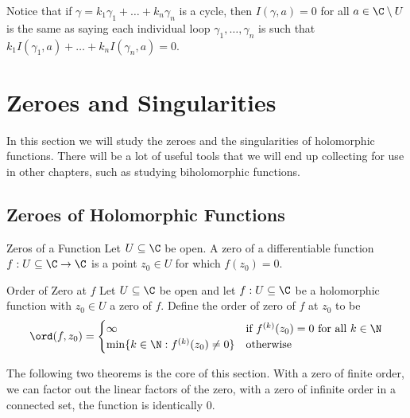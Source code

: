 \documentclass[a4paper]{article}
\begin{document}
Notice that if $\gamma=k_1\gamma_1+\dots+k_n\gamma_n$ is a cycle, then $I(\gamma,a)=0$ for all $a\in\C\setminus U$ is the same as saying each individual loop $\gamma_1,\dots,\gamma_n$ is such that $k_1I(\gamma_1,a)+\dots+k_nI(\gamma_n,a)=0$. 

\pagebreak
\section{Zeroes and Singularities}
In this section we will study the zeroes and the singularities of holomorphic functions. There will be a lot of useful tools that we will end up collecting for use in other chapters, such as studying biholomorphic functions. 

\subsection{Zeroes of Holomorphic Functions}
\begin{defn}{Zeros of a Function}{} Let $U\subseteq\C$ be open. A zero of a differentiable function $f:U\subseteq\C\to\C$ is a point $z_0\in U$ for which $f(z_0)=0$. 
\end{defn}

\begin{defn}{Order of Zero at $f$}{} Let $U\subseteq\C$ be open and let $f:U\subseteq\C$ be a holomorphic function with $z_0\in U$ a zero of $f$. Define the order of zero of $f$ at $z_0$ to be $$\ord(f,z_0)=\begin{cases}
\infty & \text{if $f^{(k)}(z_0)=0$} \text{ for all $k\in\N$}\\
\min\{k\in\N:f^{(k)}(z_0)\neq0\} & \text{otherwise}
\end{cases}$$
\end{defn}

The following two theorems is the core of this section. With a zero of finite order, we can factor out the linear factors of the zero, with a zero of infinite order in a connected set, the function is identically $0$. 
\end{document}
